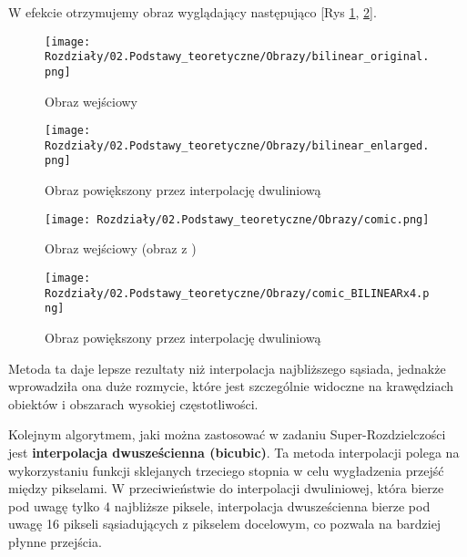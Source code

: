 W efekcie otrzymujemy obraz wyglądający następująco [Rys \ref{fig:image8},  \ref{fig:image10}].

\begin{figure}[H]
    \centering
    \begin{minipage}[t]{0.35\linewidth}
        \texttt{[image: Rozdziały/02.Podstawy\_teoretyczne/Obrazy/bilinear\_original.png]}
        \caption{Obraz wejściowy }
        \label{fig:image7}
    \end{minipage}
    \hspace{0.5cm}
    \begin{minipage}[t]{0.35\linewidth}
        \texttt{[image: Rozdziały/02.Podstawy\_teoretyczne/Obrazy/bilinear\_enlarged.png]}
        \caption{Obraz powiększony przez interpolację dwuliniową}
        \label{fig:image8}
    \end{minipage}
\end{figure}

\begin{figure}[H]
    \centering
    \begin{minipage}[t]{0.35\linewidth}
        \texttt{[image: Rozdziały/02.Podstawy\_teoretyczne/Obrazy/comic.png]}
        \caption{Obraz wejściowy (obraz z \cite{zeyde2010single})}
        \label{fig:image9}
    \end{minipage}
    \hspace{0.5cm}
    \begin{minipage}[t]{0.35\linewidth}
        \texttt{[image: Rozdziały/02.Podstawy\_teoretyczne/Obrazy/comic\_BILINEARx4.png]}
        \caption{Obraz powiększony przez interpolację dwuliniową}
        \label{fig:image10}
    \end{minipage}
\end{figure}

\newpage
Metoda ta daje lepsze rezultaty niż interpolacja najbliższego sąsiada, jednakże wprowadziła ona duże rozmycie, które jest szczególnie widoczne na krawędziach obiektów i obszarach wysokiej częstotliwości.


Kolejnym algorytmem, jaki można zastosować w zadaniu Super-Rozdzielczości jest \textbf{interpolacja dwusześcienna (bicubic)}. Ta metoda interpolacji polega na wykorzystaniu funkcji sklejanych trzeciego stopnia w celu wygładzenia przejść między pikselami. W przeciwieństwie do interpolacji dwuliniowej, która bierze pod uwagę tylko 4 najbliższe piksele, interpolacja dwusześcienna bierze pod uwagę 16 pikseli sąsiadujących z pikselem docelowym, co pozwala na bardziej płynne przejścia.

